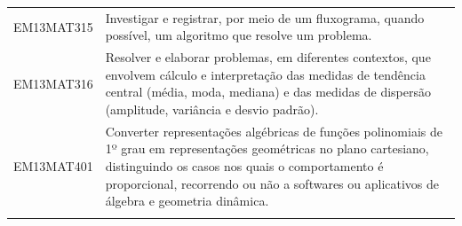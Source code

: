 \documentclass[12pt]{extarticle}
\begin{document}
\begin{longtable}{ll}
EM13MAT315 & Investigar e registrar, por meio de um fluxograma, quando possível, um algoritmo que resolve um problema.                                                                                                                                                                                                                                                                                                                                                                                                                                                                                                                                                                                                                                                                                                             \\
\rowcolor[HTML]{FFF} 
EM13MAT316 & Resolver e elaborar problemas, em diferentes contextos, que envolvem cálculo e interpretação das medidas de tendência central (média, moda, mediana) e das medidas de dispersão (amplitude, variância e desvio padrão).                                                                                                                                                                                                                                                                                                                                                                                                                                                                                                                                                                                               \\
\rowcolor[HTML]{E0F7FA} 
EM13MAT401 & Converter representações algébricas de funções polinomiais de 1º grau em representações geométricas no plano cartesiano, distinguindo os casos nos quais o comportamento é proporcional, recorrendo ou não a softwares ou aplicativos de álgebra e geometria dinâmica.                                                                                                                                                                                                                                                                                                                                                                                                                                                                                                                                                \\
\rowcolor[HTML]{FFF} 

\end{longtable}
\end{document}
